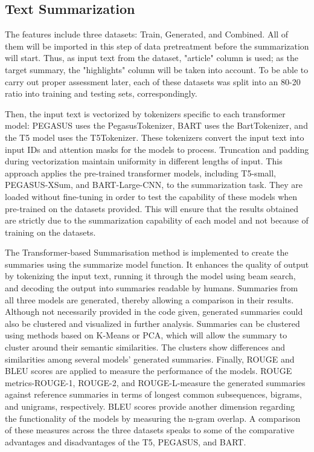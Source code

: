 \documentclass[sigplan,screen]{acmart}
\begin{document}
\subsection{Text Summarization}
 The features include three datasets: Train, Generated, and Combined. All of them will be imported in this step of data pretreatment before the summarization will start. Thus, as input text from the dataset, "article" column is used; as the target summary, the "highlights" column will be taken into account. To be able to carry out proper assessment later, each of these datasets was split into an 80-20 ratio into training and testing sets, correspondingly.

Then, the input text is vectorized by tokenizers specific to each transformer model: PEGASUS uses the PegasusTokenizer, BART uses the BartTokenizer, and the T5 model uses the T5Tokenizer. These tokenizers convert the input text into input IDs and attention masks for the models to process. Truncation and padding during vectorization maintain uniformity in different lengths of input.
This approach applies the pre-trained transformer models, including T5-small, PEGASUS-XSum, and BART-Large-CNN, to the summarization task. They are loaded without fine-tuning in order to test the capability of these models when pre-trained on the datasets provided. This will ensure that the results obtained are strictly due to the summarization capability of each model and not because of training on the datasets.

The Transformer-based Summarisation method is implemented to create the summaries using the summarize model function. It enhances the quality of output by tokenizing the input text, running it through the model using beam search, and decoding the output into summaries readable by humans. Summaries from all three models are generated, thereby allowing a comparison in their results.
Although not necessarily provided in the code given, generated summaries could also be clustered and visualized in further analysis. Summaries can be clustered using methods based on K-Means or PCA, which will allow the summary to cluster around their semantic similarities. The clusters show differences and similarities among several models' generated summaries.
Finally, ROUGE and BLEU scores are applied to measure the performance of the models. ROUGE metrics-ROUGE-1, ROUGE-2, and ROUGE-L-measure the generated summaries against reference summaries in terms of longest common subsequences, bigrams, and unigrams, respectively. BLEU scores provide another dimension regarding the functionality of the models by measuring the n-gram overlap. A comparison of these measures across the three datasets speaks to some of the comparative advantages and disadvantages of the T5, PEGASUS, and BART.
\end{document}
